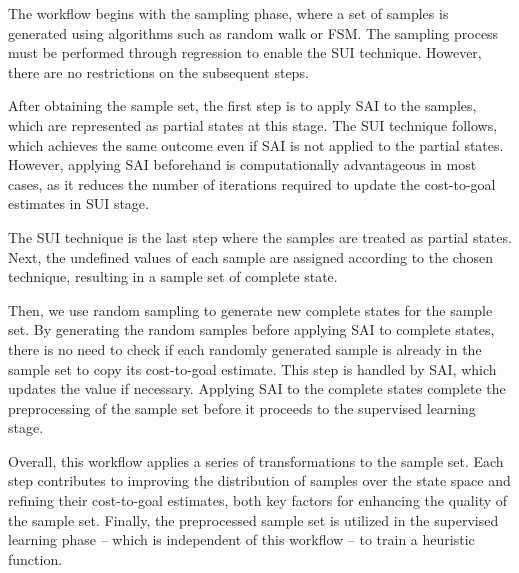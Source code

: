 The workflow begins with the sampling phase, where a set of samples is generated using algorithms such as random walk or FSM. The sampling process must be performed through regression to enable the SUI technique. However, there are no restrictions on the subsequent steps. 

After obtaining the sample set, the first step is to apply SAI to the samples, which are represented as partial states at this stage. The SUI technique follows, which achieves the same outcome even if SAI is not applied to the partial states. However, applying SAI beforehand is computationally advantageous in most cases, as it reduces the number of iterations required to update the cost-to-goal estimates in SUI stage.

The SUI technique is the last step where the samples are treated as partial states. Next, the undefined values of each sample are assigned according to the chosen technique, resulting in a sample set of complete state.

Then, we use random sampling to generate new complete states for the sample set. By generating the random samples before applying SAI to complete states, there is no need to check if each randomly generated sample is already in the sample set to copy its cost-to-goal estimate. This step is handled by SAI, which updates the value if necessary. Applying SAI to the complete states complete the preprocessing of the sample set before it proceeds to the supervised learning stage.

Overall, this workflow applies a series of transformations to the sample set. Each step contributes to improving the distribution of samples over the state space and refining their cost-to-goal estimates, both key factors for enhancing the quality of the sample set. Finally, the preprocessed sample set is utilized in the supervised learning phase -- which is independent of this workflow -- to train a heuristic function.


